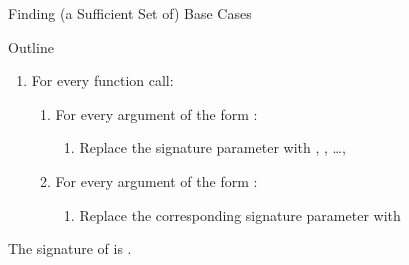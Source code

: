\documentclass{beamer}
\begin{document}
\begin{frame}[fragile]{Finding (a Sufficient Set of) Base Cases}
  \begin{block}{Outline}
    \begin{enumerate}
      \item For every \alert{function call}:
            \begin{enumerate}
              \item For every \alert{argument} of the form
                    :
                    \begin{enumerate}
                      \item Replace the \alert{signature parameter} with
                            , , \dots,
                    \end{enumerate}
              \item For every \alert{argument} of the form
                    :
                    \begin{enumerate}
                      \item Replace the corresponding signature parameter with
                    \end{enumerate}
            \end{enumerate}
    \end{enumerate}
  \end{block}
  \begin{example}
    The \alert{signature} of  is .

    \centering
  \end{example}
\end{frame}
\end{document}
